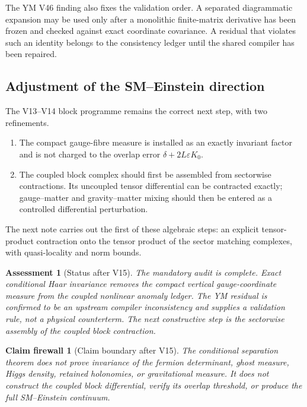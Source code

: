 \documentclass[11pt]{article}
\newtheorem{firewall}[theorem]{Claim firewall}
\newtheorem{assessment}[theorem]{Assessment}
\theoremstyle{remark}
\begin{document}
The YM V46 finding also fixes the validation order.  A separated
diagrammatic expansion may be used only after a monolithic
finite-matrix derivative has been frozen and checked against exact
coordinate covariance.  A residual that violates such an identity
belongs to the consistency ledger until the shared compiler has been
repaired.

\subsection{Adjustment of the SM--Einstein direction}

The V13--V14 block programme remains the correct next step, with two
refinements.

\begin{enumerate}
\item The compact gauge-fibre measure is installed as an exactly
      invariant factor and is not charged to the overlap error
      \(\delta+2L\varepsilon K_0\).
\item The coupled block complex should first be assembled from
      sectorwise contractions.  Its uncoupled tensor differential
      can be contracted exactly; gauge--matter and
      gravity--matter mixing should then be entered as a controlled
      differential perturbation.
\end{enumerate}

The next note carries out the first of these algebraic steps: an
explicit tensor-product contraction onto the tensor product of the
sector matching complexes, with quasi-locality and norm bounds.

\begin{assessment}[Status after V15]
\label{ass:v12v15-status}
The mandatory audit is complete.  Exact conditional Haar invariance
removes the compact vertical gauge-coordinate measure from the
coupled nonlinear anomaly ledger.  The YM residual is confirmed to
be an upstream compiler inconsistency and supplies a validation rule,
not a physical counterterm.  The next constructive step is the
sectorwise assembly of the coupled block contraction.
\end{assessment}

\begin{firewall}[Claim boundary after V15]
\label{fire:v12v15-claim}
The conditional separation theorem does not prove invariance of the
fermion determinant, ghost measure, Higgs density, retained
holonomies, or gravitational measure.  It does not construct the
coupled block differential, verify its overlap threshold, or produce
the full SM--Einstein continuum.
\end{firewall}
\end{document}
